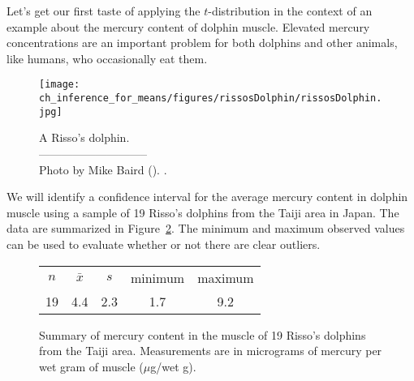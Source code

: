 
Let's get our first taste of applying the $t$-distribution
in the context of an example about the mercury content
of dolphin muscle.
Elevated mercury concentrations are an important problem
for both dolphins
and other animals, like humans, who occasionally eat them.
\setlength{\captionwidth}{86mm}

\begin{figure}[h]
\centering
\texttt{[image: ch\_inference\_for\_means/figures/rissosDolphin/rissosDolphin.jpg]}  \\
\addvspace{2mm}
\begin{minipage}{\textwidth}
   \caption[rissosDolphinPic]{A Risso's dolphin.\vspace{-1mm} \\
   -----------------------------\vspace{-2mm}\\
   {\footnotesize Photo by Mike Baird (). .}\vspace{-8mm}}
   \label{rissosDolphin}
\end{minipage}
\stdvspace{}
\end{figure}
\setlength{\captionwidth}{\mycaptionwidth}

We will identify a confidence interval for the average mercury content in dolphin muscle using a sample of 19 Risso's dolphins from the Taiji area in Japan. The data are summarized in Figure~\ref{summaryStatsOfHgInMuscleOfRissosDolphins}. The minimum and maximum observed values can be used to evaluate whether or not there are clear outliers.

\begin{figure}[h]
\centering
\begin{tabular}{ccc cc}
\hline
$n$ & $\bar{x}$ & $s$ & minimum & maximum \\
19   & 4.4	  & 2.3  & 1.7	       & 9.2 \\
\hline
\end{tabular}
\caption{Summary of mercury content in the muscle of
    19 Risso's dolphins from the Taiji area.
    Measurements are in micrograms of mercury per wet gram
    of muscle ($\mu$g/wet g).}
\label{summaryStatsOfHgInMuscleOfRissosDolphins}
\end{figure}

